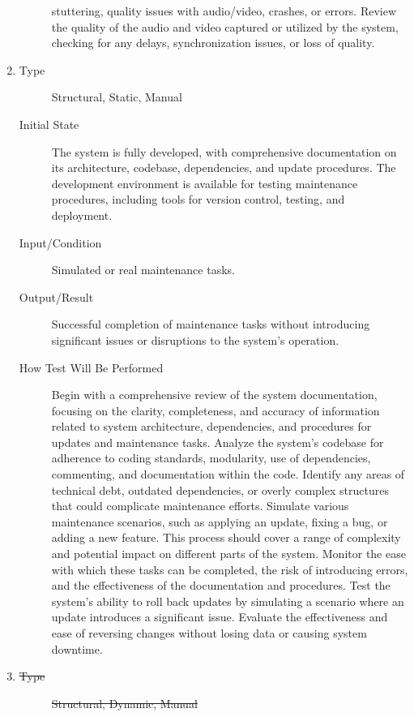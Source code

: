 \documentclass[12pt, titlepage]{article}
\begin{document}
\begin{enumerate}[NFR-T1]
\begin{description}
    stuttering, quality issues with audio/video, crashes, or errors. Review the
    quality of the audio and video captured or utilized by the system, checking
    for any delays, synchronization issues, or loss of quality.
  \end{description}
\item \label{NFRT19}
  \begin{description}
  \item[Type] Structural, Static, Manual
  \item[Initial State] The system is fully developed, with comprehensive
    documentation on its architecture, codebase, dependencies, and update
    procedures. The development environment is available for testing maintenance
    procedures, including tools for version control, testing, and deployment.
  \item[Input/Condition] Simulated or real maintenance tasks.
  \item[Output/Result] Successful completion of maintenance tasks without
    introducing significant issues or disruptions to the system's operation.
  \item[How Test Will Be Performed] Begin with a comprehensive review of the
    system documentation, focusing on the clarity, completeness, and accuracy of
    information related to system architecture, dependencies, and procedures for
    updates and maintenance tasks. Analyze the system's codebase for adherence
    to coding standards, modularity, use of dependencies, commenting, and
    documentation within the code. Identify any areas of technical debt,
    outdated dependencies, or overly complex structures that could complicate
    maintenance efforts. Simulate various maintenance scenarios, such as
    applying an update, fixing a bug, or adding a new feature. This process
    should cover a range of complexity and potential impact on different parts
    of the system. Monitor the ease with which these tasks can be completed, the
    risk of introducing errors, and the effectiveness of the documentation and
    procedures. Test the system’s ability to roll back updates by simulating a
    scenario where an update introduces a significant issue. Evaluate the
    effectiveness and ease of reversing changes without losing data or causing
    system downtime.
  \end{description}
\item \label{NFRT20}
  \begin{description}
  \item[\sout{Type}] \sout{Structural, Dynamic, Manual}

\end{description}
\end{enumerate}
\end{document}
